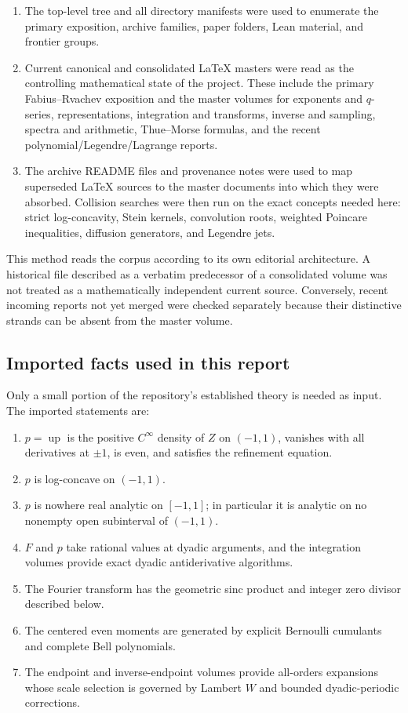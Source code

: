 \documentclass[11pt,oneside]{article}
\theoremstyle{definition}
\theoremstyle{remark}
\newcommand{\Up}{\operatorname{up}}
\begin{document}
\begin{enumerate}
\item The top-level tree and all directory manifests were used to enumerate the
primary exposition, archive families, paper folders, Lean material, and frontier
groups.
\item Current canonical and consolidated LaTeX masters were read as the controlling
mathematical state of the project.  These include the primary Fabius--Rvachev
exposition and the master volumes for exponents and $q$-series, representations,
integration and transforms, inverse and sampling, spectra and arithmetic,
Thue--Morse formulas, and the recent polynomial/Legendre/Lagrange reports.
\item The archive README files and provenance notes were used to map superseded
LaTeX sources to the master documents into which they were absorbed.  Collision
searches were then run on the exact concepts needed here: strict log-concavity,
Stein kernels, convolution roots, weighted Poincare inequalities, diffusion
generators, and Legendre jets.
\end{enumerate}

This method reads the corpus according to its own editorial architecture.  A
historical file described as a verbatim predecessor of a consolidated volume was
not treated as a mathematically independent current source.  Conversely, recent
incoming reports not yet merged were checked separately because their distinctive
strands can be absent from the master volume.

\subsection{Imported facts used in this report}
Only a small portion of the repository's established theory is needed as input.
The imported statements are:

\begin{enumerate}
\item $p=\Up$ is the positive $C^\infty$ density of $Z$ on $(-1,1)$, vanishes
with all derivatives at $\pm1$, is even, and satisfies the refinement equation.
\item $p$ is log-concave on $(-1,1)$.
\item $p$ is nowhere real analytic on $[-1,1]$; in particular it is analytic on
no nonempty open subinterval of $(-1,1)$.
\item $F$ and $p$ take rational values at dyadic arguments, and the integration
volumes provide exact dyadic antiderivative algorithms.
\item The Fourier transform has the geometric sinc product and integer zero
divisor described below.
\item The centered even moments are generated by explicit Bernoulli cumulants
and complete Bell polynomials.
\item The endpoint and inverse-endpoint volumes provide all-orders expansions
whose scale selection is governed by Lambert $W$ and bounded dyadic-periodic
corrections.
\end{enumerate}
\end{document}

